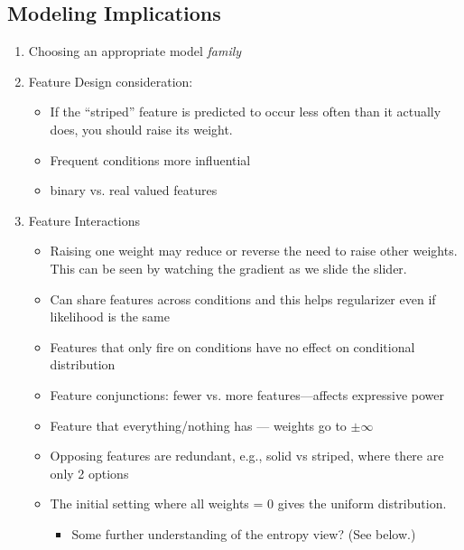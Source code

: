 \documentclass[11pt,letterpaper]{article}
\begin{document}
\subsection{Modeling Implications}
\begin{enumerate}
\item Choosing an appropriate model \textit{family}%
\item Feature Design consideration:
\begin{itemize}
\item If the “striped” feature is predicted to occur less often than it actually does, you should raise its weight.
\item Frequent conditions more influential
\item binary vs. real valued features
\end{itemize}

\item Feature Interactions
\begin{itemize} 
\item Raising one weight may reduce or reverse the need to raise other weights.  This can be seen by watching the gradient as we slide the slider.
\item Can share features across conditions and this helps regularizer even if likelihood is the same
\item Features that only fire on conditions have no effect on conditional distribution
\item Feature conjunctions: fewer vs. more features---affects expressive power
\item Feature that everything/nothing has --- weights go to $\pm \infty$
\item Opposing features are redundant, e.g., solid vs striped, where there are only 2 options
\item The initial setting where all weights = 0 gives the uniform distribution.
\begin{itemize}
\item Some further understanding of the entropy view?  (See below.)
\end{itemize}
\end{itemize}
\end{enumerate}
\end{document}
